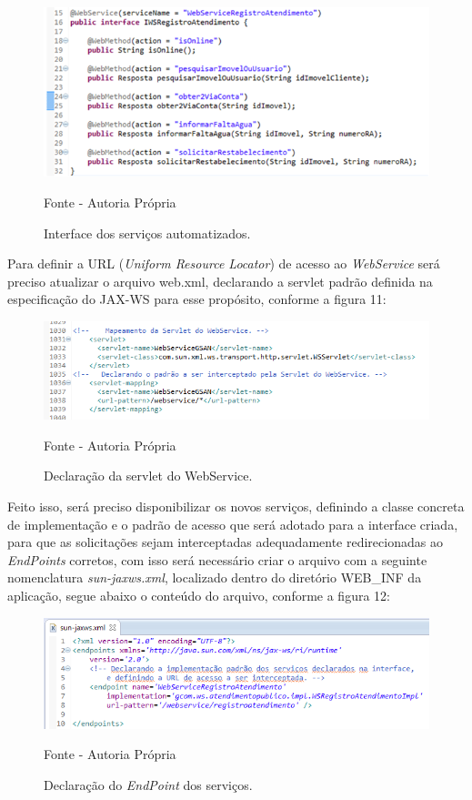\begin{figure}[!htb]
	\centering
	\includegraphics{figuras/implementacao_servicos.png}
	\caption{Interface dos serviços automatizados.}	
	Fonte - Autoria Própria
\end{figure}


Para definir a URL (\textit{Uniform Resource Locator}) de acesso ao \textit{WebService} será preciso atualizar o arquivo web.xml, declarando a servlet padrão definida na especificação do JAX-WS para esse propósito, conforme a figura 11:

\begin{figure}[!htb]
	\centering
	\includegraphics{figuras/declarando_servlet.png}
	\caption{Declaração da servlet do WebService.}	
	Fonte - Autoria Própria
\end{figure}


Feito isso, será preciso disponibilizar os novos serviços, definindo a classe concreta de implementação e o padrão de acesso que será adotado para a interface criada, para que as solicitações sejam interceptadas adequadamente redirecionadas ao \textit{EndPoints} corretos, com isso será necessário criar o arquivo com a seguinte nomenclatura \textit{sun-jaxws.xml}, localizado dentro do diretório WEB\_INF da aplicação, segue abaixo o conteúdo do arquivo, conforme a figura 12:

\begin{figure}[!htb]
	\centering
	\includegraphics{figuras/declaracao_endpoint.png}
	\caption{Declaração do \textit{EndPoint} dos serviços.}	
	Fonte - Autoria Própria
\end{figure}

